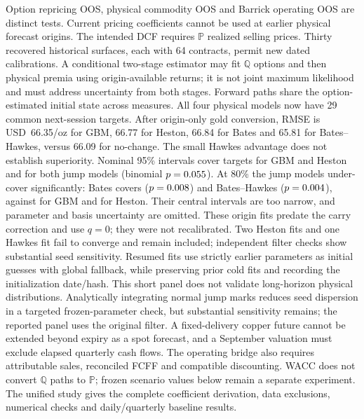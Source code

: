 Option repricing OOS, physical commodity OOS and Barrick operating OOS are
distinct tests. Current pricing coefficients cannot be used at earlier
physical forecast origins. The intended DCF requires $\mathbb P$ realized
selling prices. Thirty recovered historical surfaces, each with 64 contracts,
permit new dated calibrations. A conditional two-stage estimator may fit
$\mathbb Q$ options and then physical premia using origin-available returns;
it is not joint maximum likelihood and must address uncertainty from both
stages. Forward paths share the option-estimated initial state across measures.
All four physical models now have 29 common next-session targets.
After origin-only gold conversion, RMSE is USD~66.35/oz for GBM, 66.77
for Heston, 66.84 for Bates and 65.81 for Bates--Hawkes, versus 66.09
for no-change. The small Hawkes advantage does not establish superiority.
Nominal 95\% intervals cover \CovBSNinetyFive{} targets for GBM and Heston and \CovWNinetyFive{} for both jump models (binomial $p=0.055$).
At 80\% the jump models under-cover significantly: Bates covers \CovBEighty{} ($p=0.008$) and Bates--Hawkes \CovWEighty{} ($p=0.004$), against \CovBSEighty{} for GBM and \CovHEighty{} for Heston.
Their central intervals are too narrow, and parameter and basis uncertainty are omitted.
These origin fits predate the carry correction and use $q=0$; they were not recalibrated. Two Heston fits and
one Hawkes fit fail to converge and remain included; independent filter
checks show substantial seed sensitivity. Resumed fits use strictly earlier
parameters as initial guesses with global fallback, while preserving prior
cold fits and recording the initialization date/hash. This short panel
does not validate long-horizon physical distributions.
Analytically integrating normal jump marks reduces seed dispersion in a
targeted frozen-parameter check, but substantial sensitivity remains; the
reported panel uses the original filter.
A fixed-delivery copper future cannot be extended beyond expiry as a spot
forecast, and a September valuation must exclude elapsed quarterly cash flows.
The operating bridge also requires attributable
sales, reconciled FCFF and compatible
discounting. WACC does not convert $\mathbb Q$ paths to $\mathbb P$; frozen
scenario values below remain a separate experiment. The unified study gives
the complete coefficient derivation, data exclusions, numerical checks and
daily/quarterly baseline results.
